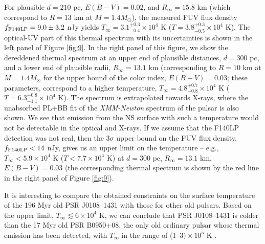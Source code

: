 \documentclass[pdftex,twocolumn]{aastex62}
\newcommand{\gp}[1]{{\color{blue} #1}}
\begin{document}
For plausible $d=210$ pc, $E(B-V)=0.02$, and $R_\infty = 15.8$ km (which correspond to $R=13$ km at $M=1.4 M_\odot$), the measured FUV flux density
$f_{\rm F140LP} = 9.0\pm 3.2$ nJy 
yields $T_\infty = 3.1^{+0.3}_{-0.4} \times 10^4$  K ($T=3.8^{+0.3}_{-0.5}\times10^4$ K). %
The 
optical-UV part of this thermal spectrum with its uncertainties   
is shown 
in the  left panel of Figure \ref{fig:9}.
In the  right panel of this figure, we show the dereddened thermal spectrum at an upper end of plausible distances, $d=300$ pc, and 
a lower end of plausible radii,  $R_\infty = 13.1$ km  (corresponding to $R=10$ km at $M=1.4 M_\odot$ \citep{LattPrak2016} for the 
upper bound of the color index, 
$E(B-V)=0.03$; these parameters, correspond to a higher temperature, $T_\infty = 4.8^{+0.7}_{-0.8} \times 10^4$ K ($T=6.3^{+0.8}_{-1.1} \times 10^4$ K).
The spectrum is extrapolated   
towards 
X-rays, where the unabsorbed PL+BB fit of the {\sl XMM-Newton} spectrum of the pulsar   
is also shown. %
We see that emission from the NS surface 
with such a temperature would not be detectable in  the optical and X-rays.
If we assume that the F140LP detection was not real, then
the $3\sigma$ upper bound on the FUV flux density, $f_{\rm F140LP} < 14$ nJy, gives us an upper limit on the
temperature -- e.g., $T_\infty < 5.9\times 10^4$ K ($T<7.7\times 10^4$ K) at $d=300$ pc, $R_\infty = 13.1$ km, $E(B-V)=0.03$ (the corresponding thermal spectrum is shown by the red line in the right panel of Figure \ref{fig:9}). 


It is interesting to compare the obtained constraints on the surface temperature of the 
 196
Myr old PSR J0108--1431 with those for other old pulsars. Based on the upper limit, $T_\infty \lesssim 6\times 10^4$ K, we can conclude that PSR J0108--1431 is colder than the 17 
Myr old PSR B0950+08, the only old ordinary pulsar whose thermal emission has been detected, with $T_\infty$ in the range of
(1--$3)\times 10^5$ K \citep{Pavlov2017}. 
\end{document}

